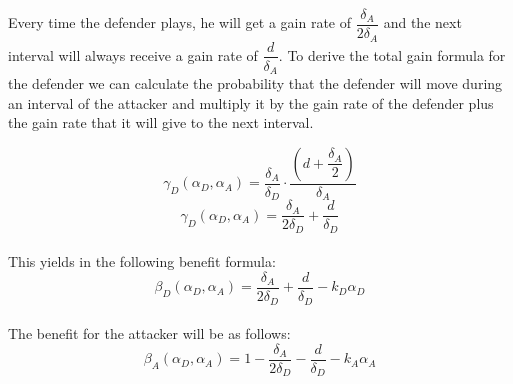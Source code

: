 \documentclass[journal,a4paper]{IEEEtran}
\begin{document}

Every time the defender plays, he will get a gain rate of $\dfrac{\delta_{A}}{2\delta_{A}}$ and the next interval will always receive a gain rate of $\dfrac{d}{\delta_{A}}$. To derive the total gain formula for the defender we can calculate the probability that the defender will move during an interval of the attacker and multiply it by the gain rate of the defender plus the gain rate that it will give to the next interval. 

\begin{equation}\label{first}
\gamma_{D}(\alpha_{D},\alpha_{A}) = \dfrac{\delta_{A}}{\delta_{D}} \cdot \dfrac{(d+\dfrac{\delta_{A}}{2})}{\delta_{A}} 
\end{equation}
\begin{equation}\label{first}
\gamma_{D}(\alpha_{D},\alpha_{A}) = \dfrac{\delta_{A}}{2\delta_{D}} + \dfrac{d}{\delta_{D}} 
\end{equation}\\
This yields in the following benefit formula:
\begin{equation}\label{first}
\beta_{D}(\alpha_{D},\alpha_{A}) = \dfrac{\delta_{A}}{2\delta_{D}} + \dfrac{d}{\delta_{D}} - k_{D} \alpha_{D} 
\end{equation}\\

The benefit for the attacker will be as follows:
\begin{equation}\label{first}
\beta_{A}(\alpha_{D},\alpha_{A}) = 1 -\dfrac{\delta_{A}}{2\delta_{D}} - \dfrac{d}{\delta_{D}} - k_{A} \alpha_{A} 
\end{equation}\\
\end{document}
